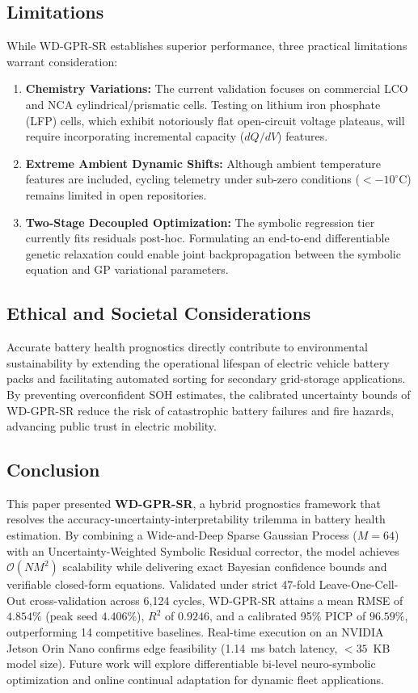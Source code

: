 \documentclass[a4paper,fleqn]{cas-sc}
\begin{document}
\subsection{Limitations}
While WD-GPR-SR establishes superior performance, three practical limitations warrant consideration:
\begin{enumerate}
    \item \textbf{Chemistry Variations:} The current validation focuses on commercial LCO and NCA cylindrical/prismatic cells. Testing on lithium iron phosphate (LFP) cells, which exhibit notoriously flat open-circuit voltage plateaus, will require incorporating incremental capacity ($dQ/dV$) features.
    \item \textbf{Extreme Ambient Dynamic Shifts:} Although ambient temperature features are included, cycling telemetry under sub-zero conditions ($<-10^\circ$C) remains limited in open repositories.
    \item \textbf{Two-Stage Decoupled Optimization:} The symbolic regression tier currently fits residuals post-hoc. Formulating an end-to-end differentiable genetic relaxation could enable joint backpropagation between the symbolic equation and GP variational parameters.
\end{enumerate}

\subsection{Ethical and Societal Considerations}
Accurate battery health prognostics directly contribute to environmental sustainability by extending the operational lifespan of electric vehicle battery packs and facilitating automated sorting for secondary grid-storage applications. By preventing overconfident SOH estimates, the calibrated uncertainty bounds of WD-GPR-SR reduce the risk of catastrophic battery failures and fire hazards, advancing public trust in electric mobility.

\subsection{Conclusion}
This paper presented \textbf{WD-GPR-SR}, a hybrid prognostics framework that resolves the accuracy-uncertainty-interpretability trilemma in battery health estimation. By combining a Wide-and-Deep Sparse Gaussian Process ($M=64$) with an Uncertainty-Weighted Symbolic Residual corrector, the model achieves $\mathcal{O}(NM^2)$ scalability while delivering exact Bayesian confidence bounds and verifiable closed-form equations. Validated under strict 47-fold Leave-One-Cell-Out cross-validation across 6,124 cycles, WD-GPR-SR attains a mean RMSE of $4.854\%$ (peak seed $4.406\%$), $R^2$ of $0.9246$, and a calibrated 95\% PICP of $96.59\%$, outperforming 14 competitive baselines. Real-time execution on an NVIDIA Jetson Orin Nano confirms edge feasibility (1.14~ms batch latency, $<35$~KB model size). Future work will explore differentiable bi-level neuro-symbolic optimization and online continual adaptation for dynamic fleet applications.
\end{document}
